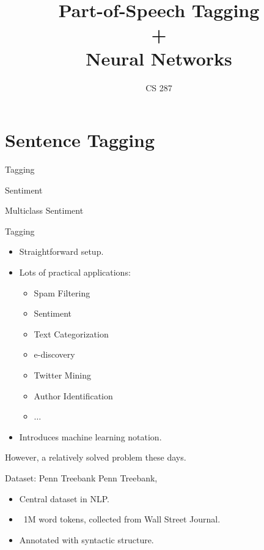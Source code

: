 \documentclass{beamer}
\title{Part-of-Speech Tagging \\ + \\   Neural Networks}
\date{}
\author{CS 287}
\begin{document}
\begin{frame}
  \titlepage
\end{frame}




\section{Sentence Tagging}

\begin{frame}{Tagging}
  
\end{frame}


\begin{frame}{Sentiment}
\end{frame}

\begin{frame}{Multiclass Sentiment}
\end{frame}

\begin{frame}{Tagging}
  \begin{itemize}
  \item Straightforward setup. 
  \item Lots of practical applications:
    \begin{itemize}
    \item Spam Filtering
    \item Sentiment
    \item Text Categorization
    \item e-discovery
    \item Twitter Mining 
    \item Author Identification
    \item $\ldots$
    \end{itemize}
  \item Introduces machine learning notation.
  \end{itemize}

  \vspace{0.24cm}

  However, a relatively solved problem these days.
\end{frame}


\begin{frame}{Dataset: Penn Treebank}
  Penn Treebank, \cite{}
  \begin{itemize}
  \item Central dataset in NLP. 
  \item ~1M word tokens, collected from Wall Street Journal.
  \item Annotated with syntactic structure. 
  \end{itemize}
\end{frame}
\end{document}
